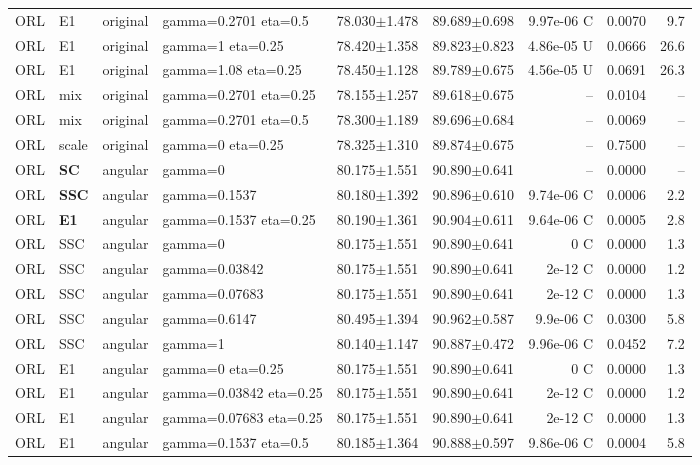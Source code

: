 \begin{longtable}{lllp{.14\linewidth}rrrrr}
ORL & E1 & original & gamma=0.2701 eta=0.5 & 78.030$\pm$1.478 & 89.689$\pm$0.698 & 9.97e-06 C & 0.0070 & 9.7\\
ORL & E1 & original & gamma=1 eta=0.25 & 78.420$\pm$1.358 & 89.823$\pm$0.823 & 4.86e-05 U & 0.0666 & 26.6\\
ORL & E1 & original & gamma=1.08 eta=0.25 & 78.450$\pm$1.128 & 89.789$\pm$0.675 & 4.56e-05 U & 0.0691 & 26.3\\
ORL & mix & original & gamma=0.2701 eta=0.25 & 78.155$\pm$1.257 & 89.618$\pm$0.675 & -- & 0.0104 & --\\
ORL & mix & original & gamma=0.2701 eta=0.5 & 78.300$\pm$1.189 & 89.696$\pm$0.684 & -- & 0.0069 & --\\
ORL & scale & original & gamma=0 eta=0.25 & 78.325$\pm$1.310 & 89.874$\pm$0.675 & -- & 0.7500 & --\\
ORL & \textbf{SC} & angular & gamma=0 & 80.175$\pm$1.551 & 90.890$\pm$0.641 & -- & 0.0000 & --\\
ORL & \textbf{SSC} & angular & gamma=0.1537 & 80.180$\pm$1.392 & 90.896$\pm$0.610 & 9.74e-06 C & 0.0006 & 2.2\\
ORL & \textbf{E1} & angular & gamma=0.1537 eta=0.25 & 80.190$\pm$1.361 & 90.904$\pm$0.611 & 9.64e-06 C & 0.0005 & 2.8\\
ORL & SSC & angular & gamma=0 & 80.175$\pm$1.551 & 90.890$\pm$0.641 & 0 C & 0.0000 & 1.3\\
ORL & SSC & angular & gamma=0.03842 & 80.175$\pm$1.551 & 90.890$\pm$0.641 & 2e-12 C & 0.0000 & 1.2\\
ORL & SSC & angular & gamma=0.07683 & 80.175$\pm$1.551 & 90.890$\pm$0.641 & 2e-12 C & 0.0000 & 1.3\\
ORL & SSC & angular & gamma=0.6147 & 80.495$\pm$1.394 & 90.962$\pm$0.587 & 9.9e-06 C & 0.0300 & 5.8\\
ORL & SSC & angular & gamma=1 & 80.140$\pm$1.147 & 90.887$\pm$0.472 & 9.96e-06 C & 0.0452 & 7.2\\
ORL & E1 & angular & gamma=0 eta=0.25 & 80.175$\pm$1.551 & 90.890$\pm$0.641 & 0 C & 0.0000 & 1.3\\
ORL & E1 & angular & gamma=0.03842 eta=0.25 & 80.175$\pm$1.551 & 90.890$\pm$0.641 & 2e-12 C & 0.0000 & 1.2\\
ORL & E1 & angular & gamma=0.07683 eta=0.25 & 80.175$\pm$1.551 & 90.890$\pm$0.641 & 2e-12 C & 0.0000 & 1.3\\
ORL & E1 & angular & gamma=0.1537 eta=0.5 & 80.185$\pm$1.364 & 90.888$\pm$0.597 & 9.86e-06 C & 0.0004 & 5.8\\

\end{longtable}
